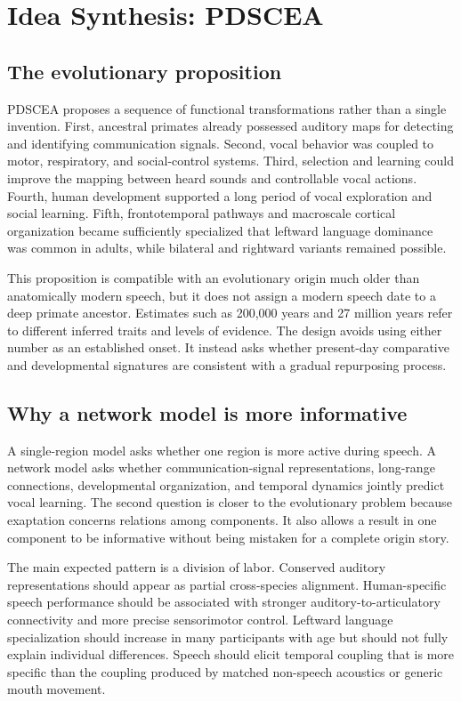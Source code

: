 \documentclass[conference]{IEEEtran}
\begin{document}
\section{Idea Synthesis: PDSCEA}

\subsection{The evolutionary proposition}

PDSCEA proposes a sequence of functional transformations rather than a single invention. First, ancestral primates already possessed auditory maps for detecting and identifying communication signals. Second, vocal behavior was coupled to motor, respiratory, and social-control systems. Third, selection and learning could improve the mapping between heard sounds and controllable vocal actions. Fourth, human development supported a long period of vocal exploration and social learning. Fifth, frontotemporal pathways and macroscale cortical organization became sufficiently specialized that leftward language dominance was common in adults, while bilateral and rightward variants remained possible.

This proposition is compatible with an evolutionary origin much older than anatomically modern speech, but it does not assign a modern speech date to a deep primate ancestor. Estimates such as 200,000 years and 27 million years refer to different inferred traits and levels of evidence. The design avoids using either number as an established onset. It instead asks whether present-day comparative and developmental signatures are consistent with a gradual repurposing process.

\subsection{Why a network model is more informative}

A single-region model asks whether one region is more active during speech. A network model asks whether communication-signal representations, long-range connections, developmental organization, and temporal dynamics jointly predict vocal learning. The second question is closer to the evolutionary problem because exaptation concerns relations among components. It also allows a result in one component to be informative without being mistaken for a complete origin story.

The main expected pattern is a division of labor. Conserved auditory representations should appear as partial cross-species alignment. Human-specific speech performance should be associated with stronger auditory-to-articulatory connectivity and more precise sensorimotor control. Leftward language specialization should increase in many participants with age but should not fully explain individual differences. Speech should elicit temporal coupling that is more specific than the coupling produced by matched non-speech acoustics or generic mouth movement.
\end{document}
